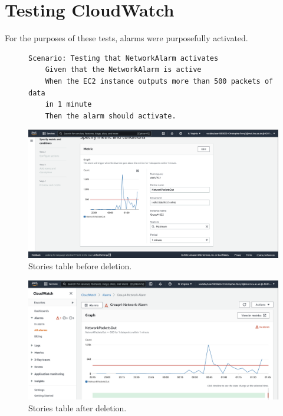 \clear

\section{Testing CloudWatch}\label{sec:testing-cloudwatch}

For the purposes of these tests, alarms were purposefully activated.

\begin{figure}[!htbp]
    \centering
    \begin{verbatim}
Scenario: Testing that NetworkAlarm activates
    Given that the NetworkAlarm is active
    When the EC2 instance outputs more than 500 packets of data
    in 1 minute
    Then the alarm should activate.
    \end{verbatim}
    \label{fig:cloudwatch-network-alarm-test}
\end{figure}

\begin{figure}[!htbp]
    \centering
    \includegraphics[width=\textwidth]{resources/cloudwatch/cloudwatch-network-alarm-setup}
    \caption{Stories table before deletion.}
    \label{fig:cloudwatch-network-alarm-setup}
\end{figure}

\begin{figure}[!htbp]
    \centering
    \includegraphics[width=\textwidth]{resources/cloudwatch/cloudwatch-network-alarm-active}
    \caption{Stories table after deletion.}
    \label{fig:cloudwatch-network-alarm-active}
\end{figure}

